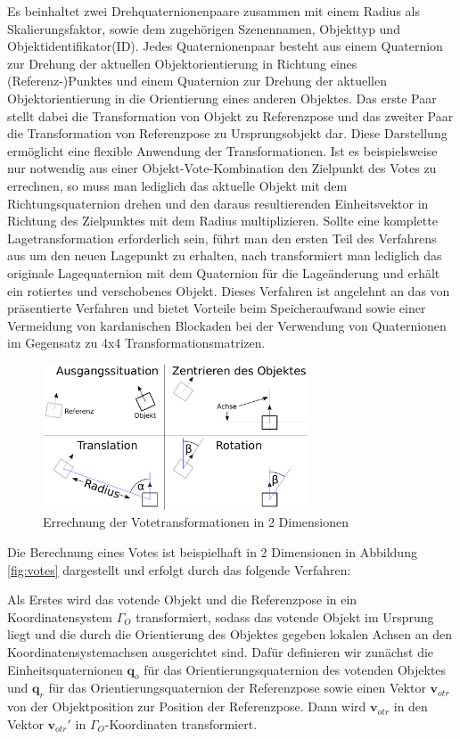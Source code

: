 Es beinhaltet zwei Drehquaternionenpaare zusammen mit einem Radius als Skalierungsfaktor, sowie dem zugehörigen Szenennamen, Objekttyp und Objektidentifikator(ID).
Jedes Quaternionenpaar besteht aus einem Quaternion zur Drehung der aktuellen Objektorientierung in Richtung eines (Referenz-)Punktes und einem Quaternion zur Drehung der aktuellen Objektorientierung in die Orientierung eines anderen Objektes.
Das erste Paar stellt dabei die Transformation von Objekt zu Referenzpose und das zweiter Paar die Transformation von Referenzpose zu Ursprungsobjekt dar.
Diese Darstellung ermöglicht eine flexible Anwendung der Transformationen.
Ist es beispielsweise nur notwendig aus einer Objekt-Vote-Kombination den Zielpunkt des Votes zu errechnen, so muss man lediglich das aktuelle Objekt mit dem Richtungsquaternion drehen und den daraus resultierenden Einheitsvektor in Richtung des Zielpunktes mit dem Radius multiplizieren.
Sollte eine komplette Lagetransformation erforderlich sein, führt man den ersten Teil des Verfahrens aus um den neuen Lagepunkt zu erhalten, nach transformiert man lediglich das originale Lagequaternion mit dem Quaternion für die Lageänderung und erhält ein rotiertes und verschobenes Objekt.
Dieses Verfahren ist angelehnt an das von \citeauthor{trove.nla.gov.au/work/45506311} präsentierte Verfahren und bietet Vorteile beim Speicheraufwand sowie einer Vermeidung von kardanischen Blockaden bei der Verwendung von Quaternionen im Gegensatz zu 4x4 Transformationsmatrizen.

\begin{figure}
  \centering
  \includegraphics[width=0.7\textwidth]{./bilder/votes.pdf}
  \caption{Errechnung der Votetransformationen in 2 Dimensionen}\label{fig:votes}
\end{figure}

Die Berechnung eines Votes ist beispielhaft in 2 Dimensionen in Abbildung \vref{fig:votes} dargestellt und erfolgt durch das folgende Verfahren:

Als Erstes wird das votende Objekt und die Referenzpose in ein Koordinatensystem $\Gamma_O$ transformiert, sodass das votende Objekt im Ursprung liegt und die durch die Orientierung des Objektes gegeben lokalen Achsen an den Koordinatensystemachsen ausgerichtet sind.
Dafür definieren wir zunächst die Einheitsquaternionen $\mathbf{q}_o$ für das Orientierungsquaternion des votenden Objektes und $\mathbf{q}_r$ für das Orientierungsquaternion der Referenzpose sowie einen Vektor $\mathbf{v}_{otr}$ von der Objektposition zur Position der Referenzpose.
Dann wird $\mathbf{v}_{otr}$ in den Vektor $\mathbf{v}_{otr}'$ in $\Gamma_O$-Koordinaten transformiert.

